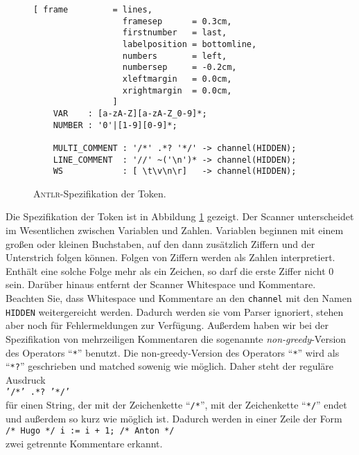 \begin{figure}[!ht]
\centering
\begin{Verbatim}[ frame         = lines, 
                  framesep      = 0.3cm, 
                  firstnumber   = last,
                  labelposition = bottomline,
                  numbers       = left,
                  numbersep     = -0.2cm,
                  xleftmargin   = 0.0cm,
                  xrightmargin  = 0.0cm,
                ]
    VAR    : [a-zA-Z][a-zA-Z_0-9]*;
    NUMBER : '0'|[1-9][0-9]*;
    
    MULTI_COMMENT : '/*' .*? '*/' -> channel(HIDDEN);
    LINE_COMMENT  : '//' ~('\n')* -> channel(HIDDEN);
    WS            : [ \t\v\n\r]   -> channel(HIDDEN);
\end{Verbatim}
\vspace*{-0.3cm}
\caption{\textsc{Antlr}-Spezifikation der Token.}
\label{fig:Simple-2.g}
\end{figure}
Die Spezifikation der Token ist in Abbildung \ref{fig:Simple-2.g}
gezeigt.  Der Scanner unterscheidet im Wesentlichen zwischen Variablen und Zahlen.
Variablen beginnen mit einem gro{\ss}en oder kleinen Buchstaben, auf den dann zus\"atzlich Ziffern und der
Unterstrich folgen k\"onnen.  Folgen von Ziffern werden als Zahlen interpretiert.  Enth\"alt eine solche
Folge mehr als ein Zeichen, so darf die erste Ziffer nicht 0 sein.  Dar\"uber hinaus entfernt der
Scanner Whitespace und Kommentare.  Beachten Sie, dass Whitespace und Kommentare an den
\texttt{channel}  mit den Namen \texttt{HIDDEN} weitergereicht werden.  Dadurch werden sie vom
Parser ignoriert, stehen aber noch f\"ur Fehlermeldungen zur Verf\"ugung.  Au{\ss}erdem haben wir bei der
Spezifikation von mehrzeiligen Kommentaren die sogenannte \emph{non-greedy}-Version des Operators
``\texttt{*}'' benutzt.  Die non-greedy-Version des Operators ``\texttt{*}'' wird als
``\texttt{*?}'' geschrieben und matched sowenig wie m\"oglich.  Daher steht der regul\"are Ausdruck
\\[0.2cm]
\hspace*{1.3cm}
\texttt{'/*' .*? '*/'}
\\[0.2cm]
f\"ur einen String, der mit der Zeichenkette ``\texttt{/*}'', mit der Zeichenkette ``\texttt{*/}''
endet und au{\ss}erdem so kurz wie m\"oglich ist.  Dadurch werden in einer Zeile der Form
\\[0.2cm]
\hspace*{1.3cm}
\texttt{/* Hugo */ i := i + 1; /* Anton */}
\\[0.2cm] 
zwei getrennte Kommentare erkannt.


